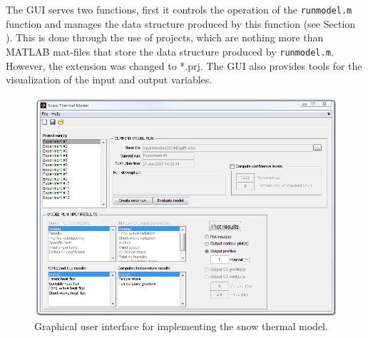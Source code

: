 The GUI serves two functions, first it controls the operation of the \texttt{runmodel.m} function and manages the data structure produced by this function (see Section ).  This is done through the use of projects, which are nothing more than MATLAB mat-files that store the data structure produced by \texttt{runmodel.m}. However, the extension was changed to *.prj.  The GUI also provides tools for the visualization of the input and output variables.

\begin{figure}[ht!]\centering
\includegraphics[width=\linewidth]{figures/gui.png}
\caption{Graphical user interface for implementing the snow thermal model.}
\label{TM:fig:gui}
\end{figure}

